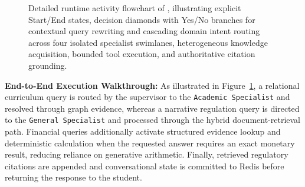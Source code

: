 \begin{figure}[!htbp]
\caption{Detailed runtime activity flowchart of \system{}, illustrating explicit Start/End states, decision diamonds with Yes/No branches for contextual query rewriting and cascading domain intent routing across four isolated specialist swimlanes, heterogeneous knowledge acquisition, bounded tool execution, and authoritative citation grounding.}
\label{fig:flowchart}
\end{figure}

\textbf{End-to-End Execution Walkthrough:} As illustrated in Figure~\ref{fig:flowchart}, a relational curriculum query is routed by the supervisor to the \texttt{Academic Specialist} and resolved through graph evidence, whereas a narrative regulation query is directed to the \texttt{General Specialist} and processed through the hybrid document-retrieval path. Financial queries additionally activate structured evidence lookup and deterministic calculation when the requested answer requires an exact monetary result, reducing reliance on generative arithmetic. Finally, retrieved regulatory citations are appended and conversational state is committed to Redis before returning the response to the student.
\FloatBarrier
